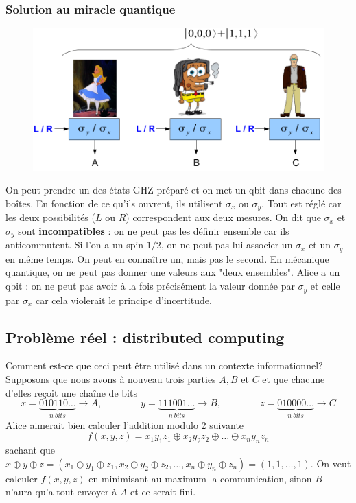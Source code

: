 \subsubsection{Solution au miracle quantique}
	\begin{figure}
	\vspace{-5mm}
	\includegraphics[scale=0.2]{ch2/image4.png}
	\end{figure}
On peut prendre un des états GHZ préparé et on met un qbit dans chacune des boîtes. En fonction de
ce qu'ils ouvrent, ils utilisent $\sigma_x$ ou $\sigma_y$. Tout est réglé car les deux possibilités
($L$ ou $R$) correspondent aux deux mesures. On dit que $\sigma_x$ et $\sigma_y$ sont 
\textbf{incompatibles} : on ne peut pas les définir ensemble car ils anticommutent. Si l'on a un
spin $1/2$, on ne peut pas lui associer un $\sigma_x$ et un $\sigma_y$ en même temps. On peut en
connaître un, mais pas le second. En mécanique quantique, on ne peut pas donner une valeurs 
aux "deux ensembles". Alice a un qbit : on ne peut pas avoir à la fois précisément la valeur donnée
par $\sigma_y$ et celle par $\sigma_x$ car cela violerait le principe d'incertitude. 

\subsection{Problème réel : distributed computing}
Comment est-ce que ceci peut être utilisé dans un contexte informationnel? Supposons que nous avons
à nouveau trois parties $A,B$ et $C$ et que chacune d'elles reçoit une chaîne de bits
\begin{equation}
x=\underbrace{010110\dots}_{n\ bits}\to A,\qquad\qquad
y=\underbrace{111001\dots}_{n\ bits}\to B,\qquad\qquad
z=\underbrace{010000\dots}_{n\ bits}\to C
\end{equation}
Alice aimerait bien calculer l'addition modulo 2 suivante
\begin{equation}
f(x,y,z) = x_1y_1z_1\oplus x_2y_2z_2\oplus\dots \oplus x_ny_nz_n
\end{equation}
sachant que $x\oplus y\oplus z=(x_1\oplus y_1\oplus z_1,x_2\oplus y_2\oplus z_2,\dots,x_n\oplus y_n\oplus z_n) = (1,1,\dots,1)$. On veut calculer
$f(x,y,z)$ en minimisant au maximum la communication, sinon $B$ n'aura qu'a tout envoyer à $A$ et 
ce serait fini. \\


